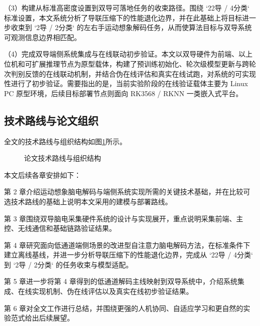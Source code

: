 （3）构建从标准高密度设置到双导可落地任务的收束路径。围绕 `22导 / 4分类` 标准设置，本文系统分析了导联压缩下的性能退化边界，并在此基础上将目标进一步收束到 `2导 / 2分类` 的左右手运动想象解码任务，从而使算法目标与双导系统可观测信息边界相匹配。

（4）完成双导端侧系统集成与在线联动初步验证。本文以双导硬件为前端、以上位机和可扩展推理节点为原型载体，构建了预训练初始化、轮次级模型更新与跨轮次判别反馈的在线联动机制，并结合伪在线评估和真实在线试跑，对系统的可实现性进行了初步验证。需要指出的是，当前实验阶段的在线验证载体主要为 Linux PC 原型环境，后续目标部署节点则面向 RK3568 / RKNN 一类嵌入式平台。

\subsection{技术路线与论文组织}

全文的技术路线与组织结构如图\ref{fig:org}所示。
\begin{figure}[htbp]
  \centering
  \caption{论文技术路线与组织结构}
  \label{fig:org}
\end{figure}

本文后续各章安排如下：

第 2 章介绍运动想象脑电解码与端侧系统实现所需的关键技术基础，并在比较可选技术路线的基础上说明本文采用的建模与部署路线。

第 3 章围绕双导脑电采集硬件系统的设计与实现展开，重点说明采集前端、主控、无线通信和基础链路验证结果。

第 4 章研究面向低通道端侧场景的改进型自注意力脑电解码方法，在标准条件下建立离线基线，并进一步分析导联压缩下的性能退化边界，完成从 `22导 / 4分类` 到 `2导 / 2分类` 的任务收束与模型适配。

第 5 章进一步将第 4 章得到的低通道解码主线映射到双导系统中，介绍系统集成、在线实现机制、伪在线评估以及真实在线初步验证结果。

第 6 章对全文工作进行总结，并围绕更强的人机协同、自适应学习和更自然的实验范式给出后续展望。
